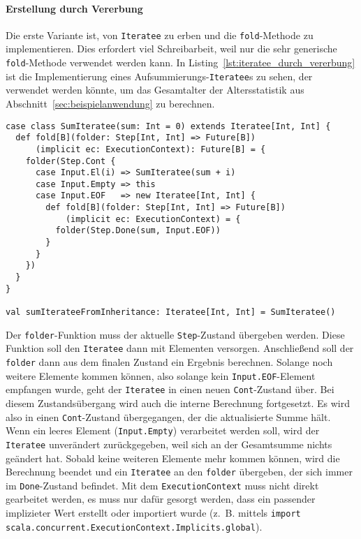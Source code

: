 \paragraph{Erstellung durch Vererbung} %
\label{par:erstellung_durch_vererbung}\mbox{} %

Die erste Variante ist, von \lstinline|Iteratee| zu erben und die \lstinline|fold|-Methode zu implementieren.
Dies erfordert viel Schreibarbeit, weil nur die sehr generische \lstinline|fold|-Methode verwendet werden kann.
In Listing~\ref{lst:iteratee_durch_vererbung} ist die Implementierung eines Aufsummierungs-\lstinline|Iteratee|s zu sehen, der verwendet werden könnte, um das Gesamtalter der Altersstatistik aus Abschnitt~\ref{sec:beispielanwendung} zu berechnen.

\begin{lstlisting}[caption=Erstellung eines Iteratees durch Vererbung, label=lst:iteratee_durch_vererbung]
case class SumIteratee(sum: Int = 0) extends Iteratee[Int, Int] {
  def fold[B](folder: Step[Int, Int] => Future[B])
      (implicit ec: ExecutionContext): Future[B] = {
    folder(Step.Cont {
      case Input.El(i) => SumIteratee(sum + i)
      case Input.Empty => this
      case Input.EOF   => new Iteratee[Int, Int] {
        def fold[B](folder: Step[Int, Int] => Future[B])
            (implicit ec: ExecutionContext) = {
          folder(Step.Done(sum, Input.EOF))
        }
      }
    })
  }
}

val sumIterateeFromInheritance: Iteratee[Int, Int] = SumIteratee()
\end{lstlisting}

Der \lstinline|folder|-Funktion muss der aktuelle \lstinline|Step|-Zustand übergeben werden.
Diese Funktion soll den \lstinline|Iteratee| dann mit Elementen versorgen.
Anschließend soll der \lstinline|folder| dann aus dem finalen Zustand ein Ergebnis berechnen.
Solange noch weitere Elemente kommen können, also solange kein \lstinline|Input.EOF|-Element empfangen wurde, geht der \lstinline|Iteratee| in einen neuen \lstinline|Cont|-Zustand über.
Bei diesem Zustandsübergang wird auch die interne Berechnung fortgesetzt.
Es wird also in einen \lstinline|Cont|-Zustand übergegangen, der die aktualisierte Summe hält.
Wenn ein leeres Element (\lstinline|Input.Empty|) verarbeitet werden soll, wird der \lstinline|Iteratee| unverändert zurückgegeben, weil sich an der Gesamtsumme nichts geändert hat.
Sobald keine weiteren Elemente mehr kommen können, wird die Berechnung beendet und ein \lstinline|Iteratee| an den \lstinline|folder| übergeben, der sich immer im \lstinline|Done|-Zustand befindet.
Mit dem \lstinline|ExecutionContext| muss nicht direkt gearbeitet werden, es muss nur dafür gesorgt werden, dass ein passender implizieter Wert erstellt oder importiert wurde (z.~B. mittels \lstinline|import scala.concurrent.ExecutionContext.Implicits.global|).

